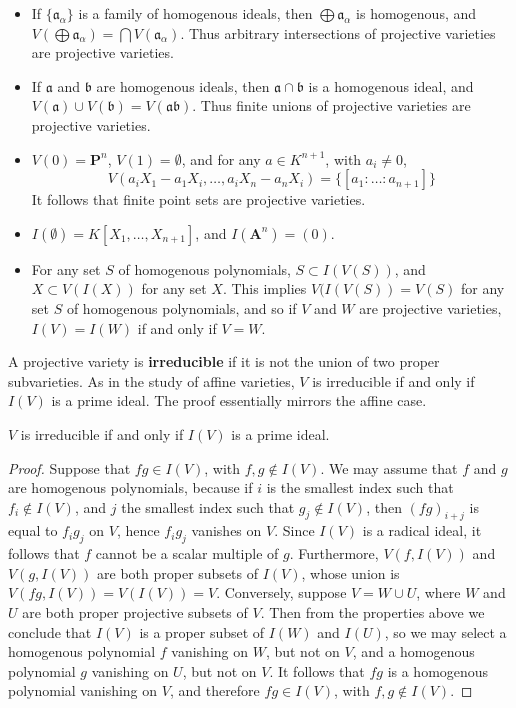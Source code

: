 \begin{itemize}
    \item If $\{ \mathfrak{a}_\alpha \}$ is a family of homogenous ideals, then $\bigoplus \mathfrak{a}_\alpha$ is homogenous, and $V(\bigoplus \mathfrak{a}_\alpha) = \bigcap V(\mathfrak{a}_\alpha)$. Thus arbitrary intersections of projective varieties are projective varieties.

    \item If $\mathfrak{a}$ and $\mathfrak{b}$ are homogenous ideals, then $\mathfrak{a} \cap \mathfrak{b}$ is a homogenous ideal, and $V(\mathfrak{a}) \cup V(\mathfrak{b}) = V(\mathfrak{a}\mathfrak{b})$. Thus finite unions of projective varieties are projective varieties.

    \item $V(0) = \mathbf{P}^n$, $V(1) = \emptyset$, and for any $a \in K^{n+1}$, with $a_i \neq 0$,
    \[ V(a_iX_1 - a_1X_i, \dots, a_iX_n - a_nX_i) = \{ [a_1:\dots:a_{n+1}] \} \]
    It follows that finite point sets are projective varieties.

    \item $I(\emptyset) = K[X_1, \dots, X_{n+1}]$, and $I(\mathbf{A}^n) = (0)$.

    \item For any set $S$ of homogenous polynomials, $S \subset I(V(S))$, and $X \subset V(I(X))$ for any set $X$. This implies $V(I(V(S)) = V(S)$ for any set $S$ of homogenous polynomials, and so if $V$ and $W$ are projective varieties, $I(V) = I(W)$ if and only if $V = W$.
\end{itemize}

A projective variety is {\bf irreducible} if it is not the union of two proper subvarieties. As in the study of affine varieties, $V$ is irreducible if and only if $I(V)$ is a prime ideal. The proof essentially mirrors the affine case.

\begin{theorem}
    $V$ is irreducible if and only if $I(V)$ is a prime ideal.
\end{theorem}
\begin{proof}
    Suppose that $fg \in I(V)$, with $f,g \not \in I(V)$. We may assume that $f$ and $g$ are homogenous polynomials, because if $i$ is the smallest index such that $f_i \not \in I(V)$, and $j$ the smallest index such that $g_j \not \in I(V)$, then $(fg)_{i + j}$ is equal to $f_ig_j$ on $V$, hence $f_ig_j$ vanishes on $V$. Since $I(V)$ is a radical ideal, it follows that $f$ cannot be a scalar multiple of $g$. Furthermore, $V(f,I(V))$ and $V(g,I(V))$ are both proper subsets of $I(V)$, whose union is $V(fg,I(V)) = V(I(V)) = V$. Conversely, suppose $V = W \cup U$, where $W$ and $U$ are both proper projective subsets of $V$. Then from the properties above we conclude that $I(V)$ is a proper subset of $I(W)$ and $I(U)$, so we may select a homogenous polynomial $f$ vanishing on $W$, but not on $V$, and a homogenous polynomial $g$ vanishing on $U$, but not on $V$. It follows that $fg$ is a homogenous polynomial vanishing on $V$, and therefore $fg \in I(V)$, with $f,g \not \in I(V)$.
\end{proof}

